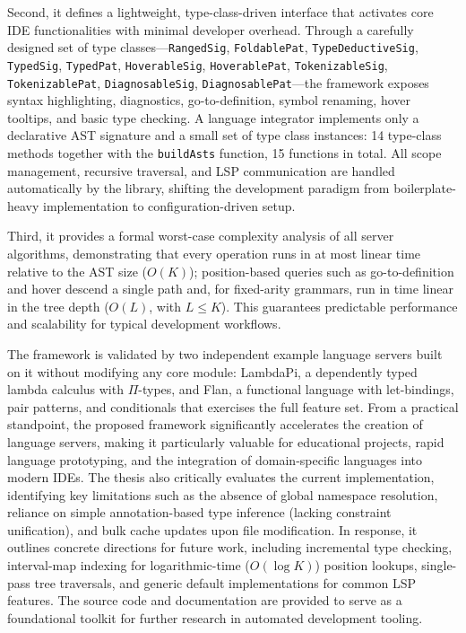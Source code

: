Second, it defines a lightweight, type-class-driven interface that activates core IDE functionalities with minimal developer overhead. 
Through a carefully designed set of type classes---\texttt{RangedSig}, \texttt{FoldablePat}, \texttt{TypeDeductiveSig}, \texttt{TypedSig}, \texttt{TypedPat}, \texttt{HoverableSig}, \texttt{HoverablePat}, \texttt{TokenizableSig}, \texttt{TokenizablePat}, \texttt{DiagnosableSig}, \texttt{DiagnosablePat}---the framework exposes syntax highlighting, diagnostics, go-to-definition, symbol renaming, hover tooltips, and basic type checking. 
A language integrator implements only a declarative AST signature and a small set of type class instances: 14 type-class methods together with the \texttt{buildAsts} function, 15 functions in total. 
All scope management, recursive traversal, and LSP communication are handled automatically by the library, shifting the development paradigm from boilerplate-heavy implementation to configuration-driven setup.

Third, it provides a formal worst-case complexity analysis of all server algorithms, demonstrating that every operation runs in at most linear time relative to the AST size ($O(K)$); position-based queries such as go-to-definition and hover descend a single path and, for fixed-arity grammars, run in time linear in the tree depth ($O(L)$, with $L \leq K$). This guarantees predictable performance and scalability for typical development workflows. 

The framework is validated by two independent example language servers built on it without modifying any core module: LambdaPi, a dependently typed lambda calculus with $\Pi$-types, and Flan, a functional language with let-bindings, pair patterns, and conditionals that exercises the full feature set. 
From a practical standpoint, the proposed framework significantly accelerates the creation of language servers, making it particularly valuable for educational projects, rapid language prototyping, and the integration of domain-specific languages into modern IDEs. 
The thesis also critically evaluates the current implementation, identifying key limitations such as the absence of global namespace resolution, reliance on simple annotation-based type inference (lacking constraint unification), and bulk cache updates upon file modification. 
In response, it outlines concrete directions for future work, including incremental type checking, interval-map indexing for logarithmic-time ($O(\log K)$) position lookups, single-pass tree traversals, and generic default implementations for common LSP features. 
The source code and documentation are provided to serve as a foundational toolkit for further research in automated development tooling.

